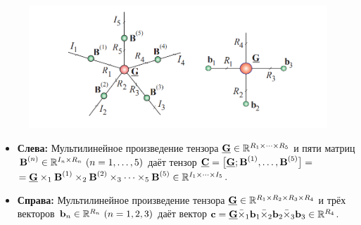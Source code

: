 \begin{frame}{}
\begin{figure}
    \centering
    \includegraphics[width=\textwidth]{lecture_10/figs/G_BB_example.png}
\end{figure}

\begin{itemize}
    \item \textbf{Слева:} Мультилинейное произведение тензора $\underline{\textbf{G}} \in \mathbb{R}^{R_1 \times \dots \times R_5}$ и пяти матриц $\textbf{B}^{(n)} \in \mathbb{R}^{I_n \times R_n} \ (n = 1, \dots, 5)$ даёт тензор $ \underline{\textbf{C}} = \big[ \underline{\textbf{G}}; \textbf{B}^{(1)}, \dots, \textbf{B}^{(5)} \big] =$ \\
    $= \underline{\textbf{G}} \times_1 \textbf{B}^{(1)} \times_2 \textbf{B}^{(2)} \times_3 \dots \times_5 \textbf{B}^{(5)} \in \mathbb{R}^{I_1 \times \dots \times I_5}$.
    \item \textbf{Справа:} Мультилинейное произведение тензора $\underline{\textbf{G}} \in \mathbb{R}^{R_1 \times R_2 \times R_3 \times R_4}$ и трёх векторов $\textbf{b}_n \in \mathbb{R}^{R_n} \ (n = 1, 2, 3)$ даёт вектор $\textbf{c} = \underline{\textbf{G}} \bar{\times}_1 \textbf{b}_1 \bar{\times}_2 \textbf{b}_2 \bar{\times}_3 \textbf{b}_3 \in \mathbb{R}^{R_4}$.
    
\end{itemize}
\end{frame}

